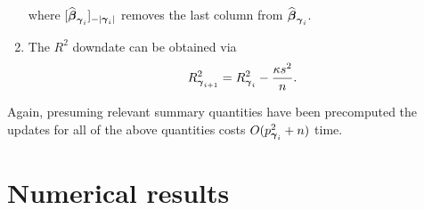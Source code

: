 \begin{enumerate}
	\noindent where $[ \widehat{{\boldsymbol \beta}}_{{\boldsymbol \gamma}_{i}}]_{-|{{\boldsymbol \gamma}_{i}}|}$
	removes the last column from $\widehat{{\boldsymbol \beta}}_{{\boldsymbol \gamma}_{i}}$.
	
	\item 
	The $R^2$ downdate can be obtained
	via
	$$
	R_{{\boldsymbol \gamma}_{i+1}}^2 = R_{{\boldsymbol \gamma}_{i}}^2 - \frac{\kappa s^2}{n}.
	$$
	
	
\end{enumerate}

\noindent Again, presuming relevant summary quantities have been precomputed
the updates for all of the above quantities costs $O(p_{{\boldsymbol \gamma}_{i}}^2 + n)$ time.



 
 
\section{Numerical results}
\label{sec:numerical}

